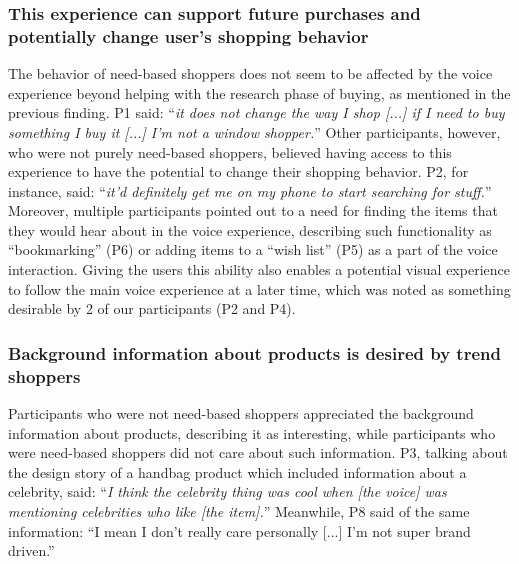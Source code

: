 \subsubsection{\textbf{This experience can support future purchases and potentially change user's shopping behavior}} The behavior of need-based shoppers does not seem to be affected by the voice experience beyond helping with the research phase of buying, as mentioned in the previous finding. P1 said: ``\textit{it does not change the way I shop [...] if I need to buy something I buy it [...] I'm not a window shopper.}'' Other participants, however, who were not purely need-based shoppers, believed having access to this experience to have the potential to change their shopping behavior. P2, for instance, said: ``\textit{it'd definitely get me on my phone to start searching for stuff.}'' Moreover, multiple participants pointed out to a need for finding the items that they would hear about in the voice experience, describing such functionality as ``bookmarking'' (P6) or adding items to a ``wish list'' (P5) as a part of the voice interaction. Giving the users this ability also enables a potential visual experience to follow the main voice experience at a later time, which was noted as something desirable by 2 of our participants (P2 and P4).

\subsubsection{\textbf{Background information about products is desired by trend shoppers}} Participants who were not need-based shoppers appreciated the background information about products, describing it as interesting, while participants who were need-based shoppers did not care about such information. P3, talking about the design story of a handbag product which included information about a celebrity, said: ``\textit{I think the celebrity thing was cool when [the voice] was mentioning celebrities who like [the item].}'' Meanwhile, P8 said of the same information: ``I mean I don't really care personally [...] I'm not super brand driven.'' 

